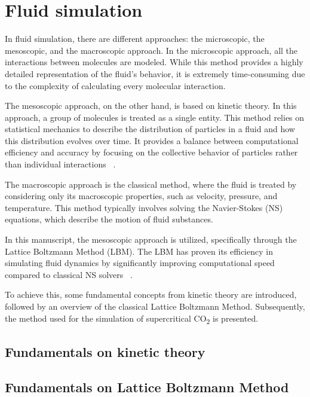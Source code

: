 \chapter{Fluid simulation}
\chaptertoc{}

In fluid simulation, there are different approaches: the microscopic, the
mesoscopic, and the macroscopic approach. In the microscopic approach, all the
interactions between molecules are modeled. While this method provides a highly
detailed representation of the fluid's behavior, it is extremely time-consuming
due to the complexity of calculating every molecular interaction.

The mesoscopic approach, on the other hand, is based on kinetic theory. In this
approach, a group of molecules is treated as a single entity. This method relies
on statistical mechanics to describe the distribution of particles in a fluid
and how this distribution evolves over time. It provides a balance between
computational efficiency and accuracy by focusing on the collective behavior of
particles rather than individual interactions ~\cite{kruger2017lattice}.

The macroscopic approach is the classical method, where the fluid is treated by
considering only its macroscopic properties, such as velocity, pressure, and
temperature. This method typically involves solving the Navier-Stokes (NS)
equations, which describe the motion of fluid substances.

In this manuscript, the mesoscopic approach is utilized, specifically through
 the Lattice Boltzmann Method (LBM). The LBM has proven its efficiency in
 simulating fluid dynamics by significantly improving computational speed
 compared to classical NS solvers ~\cite{boivin2021benchmarking}.

To achieve this, some fundamental concepts from kinetic theory are introduced,
followed by an overview of the classical Lattice Boltzmann Method. Subsequently,
the method used for the simulation of supercritical CO\textsubscript{2} is
presented.

\section{Fundamentals on kinetic theory}

\section{Fundamentals on Lattice Boltzmann Method}

